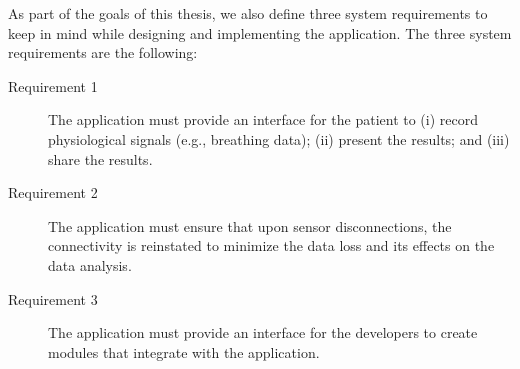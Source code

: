 As part of the goals of this thesis, we also define three system requirements to keep in mind while designing and implementing the application. The three system requirements are the following: 

\begin{description}
    \item[Requirement 1] The application must provide an interface for the patient to (i) record physiological signals (e.g., breathing data); (ii) present the results; and (iii) share the results.
    \item[Requirement 2] The application must ensure that upon sensor disconnections, the connectivity is reinstated to minimize the data loss and its effects on the data analysis.
    \item[Requirement 3] The application must provide an interface for the developers to create modules that integrate with the application.
\end{description}

